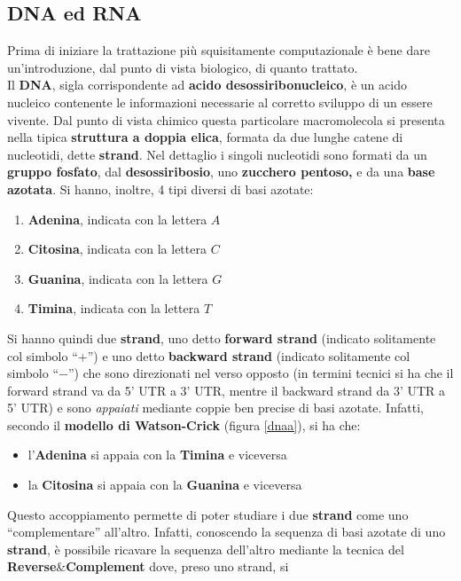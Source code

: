 \documentclass[a4paper,12pt, oneside]{book}
\begin{document}
\subsection{DNA ed RNA}
Prima di iniziare la trattazione più squisitamente computazionale è bene dare
un'introduzione, dal punto di vista biologico, di quanto trattato.\\
Il \textbf{DNA}, sigla corrispondente ad \textbf{acido desossiribonucleico}, è
un acido nucleico contenente le informazioni necessarie al corretto sviluppo di
un essere vivente. Dal punto di vista chimico questa particolare macromolecola
si presenta nella tipica \textbf{struttura a doppia elica}, formata da due
lunghe catene di nucleotidi, dette \textbf{strand}. Nel dettaglio i singoli
nucleotidi sono formati da un \textbf{gruppo fosfato}, dal
\textbf{desossiribosio}, uno \textbf{zucchero pentoso,} e da una \textbf{base
  azotata}. Si hanno, inoltre, 4 tipi diversi di basi azotate:
\begin{enumerate}
  \item \textbf{Adenina}, indicata con la lettera $A$
  \item \textbf{Citosina}, indicata con la lettera $C$
  \item \textbf{Guanina}, indicata con la lettera $G$
  \item \textbf{Timina}, indicata con la lettera $T$
\end{enumerate}
Si hanno quindi due \textbf{strand}, uno detto \textbf{forward
  strand} (indicato solitamente col simbolo ``+'') e uno detto \textbf{backward
  strand} (indicato solitamente col simbolo ``$-$'') che sono direzionati nel verso 
opposto (in termini tecnici si ha che il forward strand va da 5' UTR a 3' UTR,
mentre il backward strand da 3' UTR a 5' UTR) e sono \textit{appaiati} mediante
coppie ben precise di basi azotate.
Infatti, secondo il \textbf{modello di Watson-Crick} (figura \ref{dnaa}), si
ha che:  
\begin{itemize}
  \item l'\textbf{Adenina} si appaia con la \textbf{Timina} e viceversa
  \item la \textbf{Citosina} si appaia con la \textbf{Guanina} e viceversa
\end{itemize}
Questo accoppiamento permette di poter studiare i due \textbf{strand} come uno
``complementare'' all'altro. Infatti, conoscendo la sequenza di basi azotate di
uno \textbf{strand}, è possibile ricavare la sequenza dell'altro mediante la
tecnica del \textbf{Reverse}\&\textbf{Complement} dove, preso uno strand, si
\end{document}
